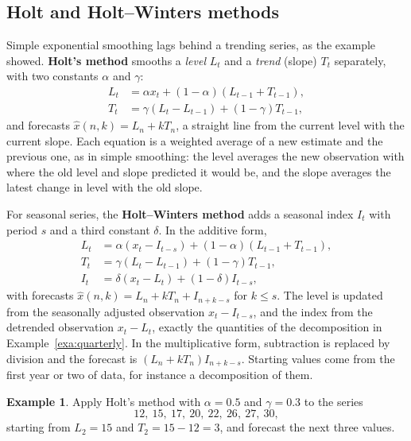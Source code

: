 \documentclass[11pt,a4paper]{article}
\theoremstyle{definition}
\newtheorem{exa}[thm]{Example}
\begin{document}
\subsection{Holt and Holt--Winters methods}
Simple exponential smoothing lags behind a trending series, as the example showed. \textbf{Holt's method}
smooths a \emph{level} $L_t$ and a \emph{trend} (slope) $T_t$ separately, with two constants $\alpha$ and $\gamma$:
\begin{align*}
L_t &= \alpha x_t + (1 - \alpha)(L_{t-1} + T_{t-1}) , \\
T_t &= \gamma(L_t - L_{t-1}) + (1 - \gamma)T_{t-1} ,
\end{align*}
and forecasts $\hat x(n, k) = L_n + kT_n$, a straight line from the current level with the current slope. Each equation is a
weighted average of a new estimate and the previous one, as in simple smoothing: the level averages the
new observation with where the old level and slope predicted it would be, and the slope averages the latest
change in level with the old slope.

For seasonal series, the \textbf{Holt--Winters method} adds a seasonal index $I_t$ with period $s$ and a third constant $\delta$.
In the additive form,
\begin{align*}
L_t &= \alpha(x_t - I_{t-s}) + (1 - \alpha)(L_{t-1} + T_{t-1}) , \\
T_t &= \gamma(L_t - L_{t-1}) + (1 - \gamma)T_{t-1} , \\
I_t &= \delta(x_t - L_t) + (1 - \delta)I_{t-s} ,
\end{align*}
with forecasts $\hat x(n, k) = L_n + kT_n + I_{n+k-s}$ for $k \le s$. The level is updated from the seasonally adjusted observation $x_t - I_{t-s}$, and
the index from the detrended observation $x_t - L_t$, exactly the quantities of the decomposition in
Example~\ref{exa:quarterly}. In the multiplicative form, subtraction is replaced by division and
the forecast is $(L_n + kT_n)I_{n+k-s}$. Starting values come from the first year or two of data, for instance a
decomposition of them.

\begin{exa}\label{exa:holt}
Apply Holt's method with $\alpha = 0.5$ and $\gamma = 0.3$ to the series
\[
12, \ 15, \ 17, \ 20, \ 22, \ 26, \ 27, \ 30 ,
\]
starting from $L_2 = 15$ and $T_2 = 15 - 12 = 3$, and forecast the next three values.
\end{exa}
\end{document}
